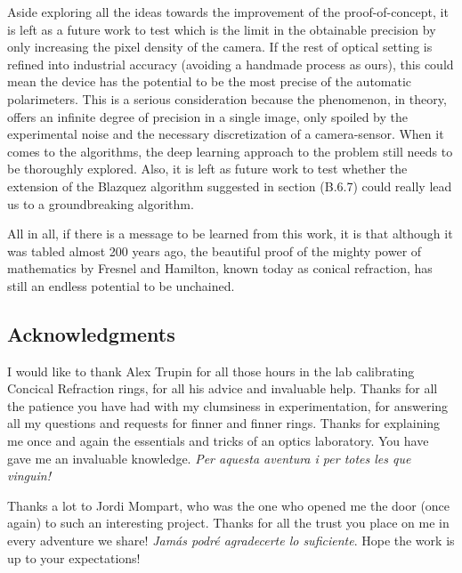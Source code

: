 \documentclass[11pt, a4paper, twoside]{article} %
\begin{document}
Aside exploring all the ideas towards the improvement of the proof-of-concept, it is left as a future work to test which is the limit in the obtainable precision by only increasing the pixel density of the camera. If the rest of optical setting is refined into industrial accuracy (avoiding a handmade process as ours), this could mean the device has the potential to be the most precise of the automatic polarimeters. This is a serious consideration because the phenomenon, in theory, offers an infinite degree of precision in a single image, only spoiled by the experimental noise and the necessary discretization of a camera-sensor. When it comes to the algorithms, the deep learning approach to the problem still needs to be thoroughly explored. Also, it is left as future work to test whether the extension of the Blazquez algorithm suggested in section (B.6.7) could really lead us to a groundbreaking algorithm. \vspace{-0.07cm}

All in all, if there is a message to be learned from this work, it is that although it was tabled almost 200 years ago, the beautiful proof of the mighty  power of mathematics by Fresnel and Hamilton, known today as conical refraction, has still an endless potential to be unchained.

\vspace{-0.15cm}

\subsection*{Acknowledgments \vspace{-0.15cm}}
I would like to thank Alex Trupin for all those hours in the lab calibrating Concical Refraction rings, for all his advice and invaluable help. Thanks for all the patience you have had with my clumsiness in experimentation, for answering all my questions and requests for finner and finner rings. Thanks for explaining me once and again the essentials and tricks of an optics laboratory. You have gave me an invaluable knowledge. {\em Per aquesta aventura i per totes les que vinguin!}\vspace{-0.05cm}

Thanks a lot to Jordi Mompart, who was the one who opened me the door (once again) to such an interesting project. Thanks for all the trust you place on me in every adventure we share! {\em Jamás podré agradecerte lo suficiente}. Hope the work is up to your expectations! \vspace{-0.05cm}
\end{document}
